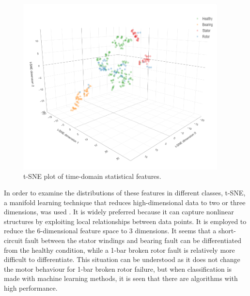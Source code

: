\begin{figure}[h]
	\centering
	\includegraphics[width=300pt,keepaspectratio=true]{./fig/sne_current.PNG}
	\caption{t-SNE plot of time-domain statistical features.}	
	\label{snec}
\end{figure}

In order to examine the distributions of these features in different classes, t-SNE, a manifold learning technique that reduces high-dimensional data to two or three dimensions, was used \cite{van2008visualizing}. It is widely preferred because it can capture nonlinear structures by exploiting local relationships between data points. It is employed to reduce the 6-dimensional feature space to 3 dimensions. It seems that a short-circuit fault between the stator windings and bearing fault can be differentiated from the healthy condition, while a 1-bar broken rotor fault is relatively more difficult to differentiate. This situation can be understood as it does not change the motor behaviour for 1-bar broken rotor failure, but when classification is made with machine learning methods, it is seen that there are algorithms with high performance.

